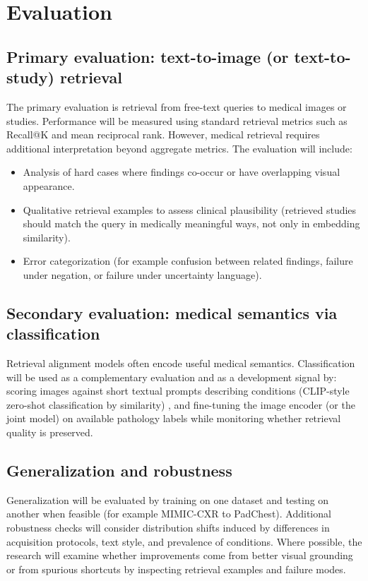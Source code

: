 \documentclass[11pt,a4paper]{article}
\begin{document}
\section{Evaluation}
\subsection{Primary evaluation: text-to-image (or text-to-study) retrieval}
The primary evaluation is retrieval from free-text queries to medical images or studies. Performance will be measured using standard retrieval metrics such as Recall@K and mean reciprocal rank. However, medical retrieval requires additional interpretation beyond aggregate metrics. The evaluation will include:
\begin{itemize}
    \item Analysis of hard cases where findings co-occur or have overlapping visual appearance.
    \item Qualitative retrieval examples to assess clinical plausibility (retrieved studies should match the query in medically meaningful ways, not only in embedding similarity).
    \item Error categorization (for example confusion between related findings, failure under negation, or failure under uncertainty language).
\end{itemize}

\subsection{Secondary evaluation: medical semantics via classification}
Retrieval alignment models often encode useful medical semantics. Classification will be used as a complementary evaluation and as a development signal by:
scoring images against short textual prompts describing conditions (CLIP-style zero-shot classification by similarity) \cite{radford2021clip}, and fine-tuning the image encoder (or the joint model) on available pathology labels while monitoring whether retrieval quality is preserved.

\subsection{Generalization and robustness}
Generalization will be evaluated by training on one dataset and testing on another when feasible (for example MIMIC-CXR to PadChest). Additional robustness checks will consider distribution shifts induced by differences in acquisition protocols, text style, and prevalence of conditions. Where possible, the research will examine whether improvements come from better visual grounding or from spurious shortcuts by inspecting retrieval examples and failure modes.
\end{document}
